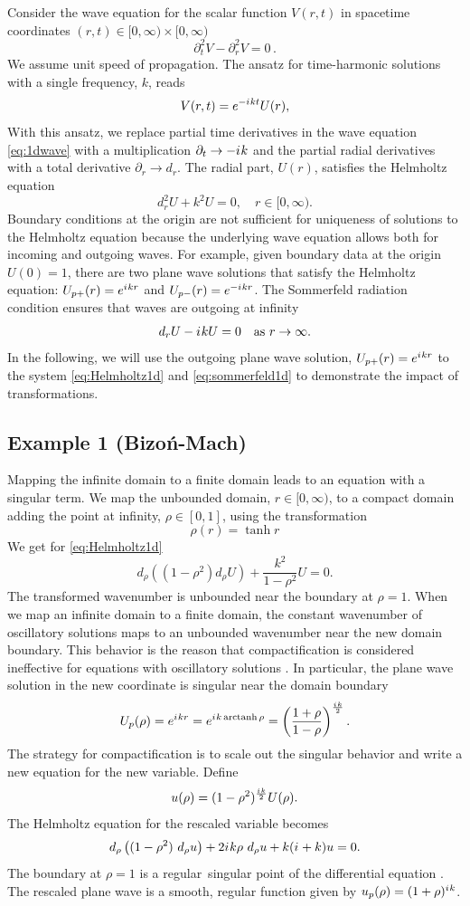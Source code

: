 \documentclass[final,onefignum,onetabnum]{siamart190516}
\newcommand{\be}{\begin{equation}}
\newcommand{\ee}{\end{equation}}
\newcommand{\iu}{{i\mkern1mu}}
\DeclareMathOperator\arctanh{arctanh}
\begin{document}
Consider the wave equation for the scalar function $V(r,t)$ in spacetime coordinates $(r,t)\in[0,\infty)\times[0,\infty)$
\be\label{eq:1dwave} \partial_t^2 V - \partial_r^2 V = 0\,. \ee
We assume unit speed of propagation. The ansatz for time-harmonic solutions with a single frequency, $k$, reads
\be\label{eq:ansatz} 
V(r,t)= e^{-\iu k t} U(r),
\ee 
With this ansatz, we replace partial time derivatives in the wave equation \eqref{eq:1dwave} with a multiplication $\partial_t\to-\iu k$ and the partial radial derivatives with a total derivative $\partial_r\to d_r$. The radial part, $U(r)$, satisfies the Helmholtz equation 
\be
\label {eq:Helmholtz1d} d_r^2 U + k^2 U = 0, \quad r\in[0,\infty).
\ee
Boundary conditions at the origin are not sufficient for uniqueness of solutions to the Helmholtz equation because the underlying wave equation allows both for incoming and outgoing waves. For example, given boundary data at the origin $U(0)=1$, there are two plane wave solutions that satisfy the Helmholtz equation: $U_{p+}(r) = e^{\iu k r}$ and $U_{p-}(r) = e^{-\iu k r}$. The Sommerfeld radiation condition ensures that waves are outgoing at infinity
\be
\label{eq:sommerfeld1d}d_r U - \iu k U = 0 \quad \mathrm{as} \ r\to\infty.
\ee
In the following, we will use the outgoing plane wave solution, $U_{p+}(r)=e^{\iu k r}$ to the system \eqref{eq:Helmholtz1d} and \eqref{eq:sommerfeld1d} to demonstrate the impact of transformations.

\subsection{Example 1 (Bizoń-Mach)}
Mapping the infinite domain to a finite domain leads to an equation with a singular term. We map the unbounded domain, $r\in[0,\infty)$, to a compact domain adding the point at infinity, $\rho\in[0,1]$, using the transformation
\be\label{eq:space_compact1d} \rho(r) = \tanh r \ee
We get for \eqref{eq:Helmholtz1d}
\be\label{eq:simple} 
d_\rho\left((1-\rho^2) d_\rho U \right)+ \frac{k^2}{1-\rho^2} U = 0. 
\ee
The transformed wavenumber is unbounded near the boundary at $\rho=1$. When we map an infinite domain to a finite domain, the constant wavenumber of oscillatory solutions maps to an unbounded wavenumber near the new domain boundary. This behavior is the reason that compactification is considered ineffective for equations with oscillatory solutions \cite{GroschOrszag77, shen2014approximations}. In particular, the plane wave solution in the new coordinate is singular near the domain boundary
\[ U_p(\rho)=e^{\iu k r} =  e^{\iu k \arctanh\rho} = \left(\frac{1+\rho}{1-\rho}\right)^{\frac{\iu k}{2}}.\]
The strategy for compactification is to scale out the singular behavior and write a new equation for the new variable. Define
\be\label{eq:trafo1d} u(\rho) = (1-\rho^2)^{\frac{\iu k}{2}} U(\rho). \ee
The Helmholtz equation for the rescaled variable becomes
\be\label{eq:transformed} 
d_\rho\left((1-\rho^2) \ d_\rho u \right) + 2\iu k \rho\ d_\rho u + k (\iu+k) u = 0. 
\ee
The boundary at $\rho=1$ is a regular singular point of the differential equation \cite{powers2009boundary}. The rescaled plane wave is a smooth, regular function given by $u_p(\rho) = (1+\rho)^{\iu k}$. 
\end{document}
